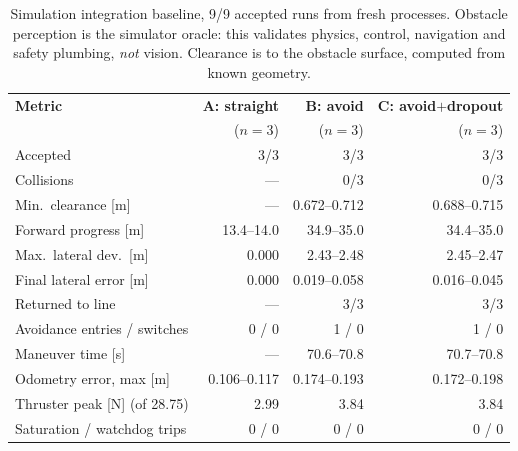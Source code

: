 \begin{table}[t]
\centering
\caption{Simulation integration baseline, 9/9 accepted runs from fresh
processes. Obstacle perception is the simulator oracle: this validates
physics, control, navigation and safety plumbing, \emph{not} vision.
Clearance is to the obstacle surface, computed from known geometry.}
\label{tab:baseline0}
\footnotesize
\setlength{\tabcolsep}{3pt}
\renewcommand{\arraystretch}{1.15}
\begin{tabular}{@{}p{26mm} r r r@{}}
\toprule
\textbf{Metric} & \textbf{A: straight} & \textbf{B: avoid} &
\textbf{C: avoid$+$dropout} \\
 & ($n{=}3$) & ($n{=}3$) & ($n{=}3$) \\
\midrule
Accepted                    & 3/3 & 3/3 & 3/3 \\
Collisions                  & --- & 0/3 & 0/3 \\
Min.\ clearance [m]         & --- & 0.672--0.712 & 0.688--0.715 \\
Forward progress [m]        & 13.4--14.0 & 34.9--35.0 & 34.4--35.0 \\
Max.\ lateral dev.\ [m]     & 0.000 & 2.43--2.48 & 2.45--2.47 \\
Final lateral error [m]     & 0.000 & 0.019--0.058 & 0.016--0.045 \\
Returned to line            & --- & 3/3 & 3/3 \\
Avoidance entries / switches& 0 / 0 & 1 / 0 & 1 / 0 \\
Maneuver time [s]           & --- & 70.6--70.8 & 70.7--70.8 \\
Odometry error, max [m]     & 0.106--0.117 & 0.174--0.193 & 0.172--0.198 \\
Thruster peak [N] (of 28.75)& 2.99 & 3.84 & 3.84 \\
Saturation / watchdog trips & 0 / 0 & 0 / 0 & 0 / 0 \\
\bottomrule
\end{tabular}
\end{table}
